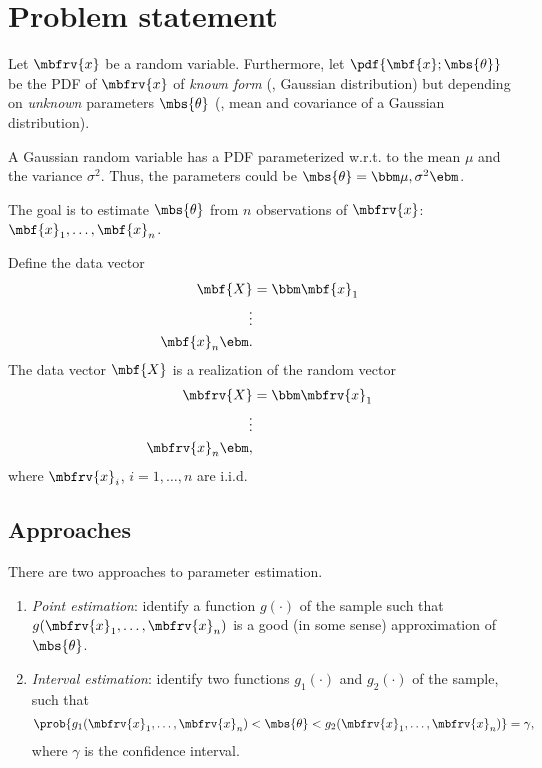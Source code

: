 \section{Problem statement}
Let $\mbfrv{x}$ be a random variable. Furthermore, let $\pdf{\mbf{x}; \mbs{\theta}}$ be the PDF of $\mbfrv{x}$ of \emph{known form} (\eg, Gaussian distribution) but depending on \emph{unknown} parameters $\mbs{\theta}$ (\eg, mean and covariance of a Gaussian distribution).
\begin{example}
    A Gaussian random variable has a PDF parameterized w.r.t. to the mean ${\mu}$ and the variance $\sigma^{2}$. Thus, the parameters could be $\mbs{\theta} = \bbm \mu, \sigma^{2} \ebm$.
\end{example}

The goal is to estimate $\mbs{\theta}$ from $n$ observations of $\mbfrv{x}$: $\mbf{x}_{1}, \ldots, \mbf{x}_{n}$. 

Define the data vector 
\begin{align}
    \mbf{X} &= \bbm \mbf{x}_{1}\\\vdots\\\mbf{x}_{n} \ebm.
\end{align}
The data vector $\mbf{X}$ is a realization of the random vector 
\begin{align}
    \mbfrv{X} &= \bbm \mbfrv{x}_{1} \\ \vdots \\ \mbfrv{x}_{n} \ebm,
\end{align}
where $\mbfrv{x}_{i}$, $i=1,\ldots, n$ are i.i.d.

\subsection*{Approaches}
There are two approaches to parameter estimation.
\begin{enumerate}
    \item \emph{Point estimation}: identify a function $g(\cdot)$ of the sample such that $g(\mbfrv{x}_{1},\ldots, \mbfrv{x}_{n})$ is a good (in some sense) approximation of $\mbs{\theta}$.
    \item \emph{Interval estimation}: identify two functions $g_{1}(\cdot)$ and $g_{2}(\cdot)$ of the sample, such that
    \begin{align}
        \prob{g_{1}(\mbfrv{x}_{1},\ldots,\mbfrv{x}_{n})<\mbs{\theta}<g_{2}(\mbfrv{x}_{1},\ldots,\mbfrv{x}_{n})} = \gamma,
    \end{align}
    where $\gamma$ is the confidence interval.
\end{enumerate}

